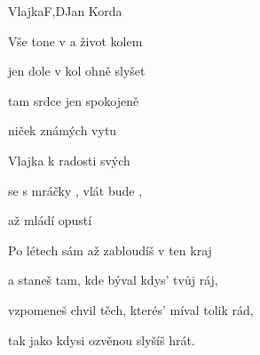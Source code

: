 \setcounter{page}{98}
\begin{song}{Vlajka}{F,D}{Jan Korda}
\begin{SBVerse}
Vše tone v  a život kolem 

jen dole v  kol ohně slyšet 

tam srdce  jen spokojeně 

niček známých vytu
\end{SBVerse}
\begin{SBChorus}
Vlajka   k radosti svých 

 se s mráčky , vlát bude , 

až mládí  opustí 
\end{SBChorus}
\begin{SBVerse}
Po létech sám až zabloudíš v ten kraj 

a staneš tam, kde býval kdys' tvůj ráj,

vzpomeneš chvil těch, kterés' míval tolik rád, 

tak jako kdysi ozvěnou slyšíš hrát.
\end{SBVerse}
\end{song}

\pagebreak
